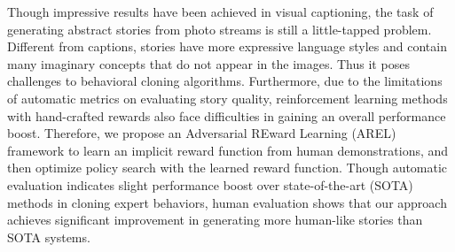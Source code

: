 Though impressive results have been achieved in visual captioning, the task of generating abstract stories from photo streams is still a little-tapped problem. Different from captions, stories have more expressive language styles and contain many imaginary concepts that do not appear in the images. Thus it poses challenges to behavioral cloning algorithms. Furthermore, due to the limitations of automatic metrics on evaluating story quality, reinforcement learning methods with hand-crafted rewards also face difficulties in gaining an overall performance boost. Therefore, we propose an Adversarial REward Learning (AREL) framework to learn an implicit reward function from human demonstrations, and then optimize policy search with the learned reward function. Though automatic evaluation indicates slight performance boost over state-of-the-art (SOTA) methods in cloning expert behaviors, human evaluation shows that our approach achieves significant improvement in generating more human-like stories than SOTA systems.
